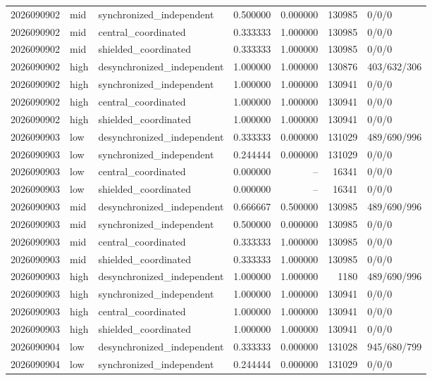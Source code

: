 \begin{longtable}{llp{38mm}rrrp{30mm}}
2026090902 & mid & synchronized\_independent & 0.500000 & 0.000000 & 130985 & 0/0/0 \\
2026090902 & mid & central\_coordinated & 0.333333 & 1.000000 & 130985 & 0/0/0 \\
2026090902 & mid & shielded\_coordinated & 0.333333 & 1.000000 & 130985 & 0/0/0 \\
2026090902 & high & desynchronized\_independent & 1.000000 & 1.000000 & 130876 & 403/632/306 \\
2026090902 & high & synchronized\_independent & 1.000000 & 1.000000 & 130941 & 0/0/0 \\
2026090902 & high & central\_coordinated & 1.000000 & 1.000000 & 130941 & 0/0/0 \\
2026090902 & high & shielded\_coordinated & 1.000000 & 1.000000 & 130941 & 0/0/0 \\
2026090903 & low & desynchronized\_independent & 0.333333 & 0.000000 & 131029 & 489/690/996 \\
2026090903 & low & synchronized\_independent & 0.244444 & 0.000000 & 131029 & 0/0/0 \\
2026090903 & low & central\_coordinated & 0.000000 & -- & 16341 & 0/0/0 \\
2026090903 & low & shielded\_coordinated & 0.000000 & -- & 16341 & 0/0/0 \\
2026090903 & mid & desynchronized\_independent & 0.666667 & 0.500000 & 130985 & 489/690/996 \\
2026090903 & mid & synchronized\_independent & 0.500000 & 0.000000 & 130985 & 0/0/0 \\
2026090903 & mid & central\_coordinated & 0.333333 & 1.000000 & 130985 & 0/0/0 \\
2026090903 & mid & shielded\_coordinated & 0.333333 & 1.000000 & 130985 & 0/0/0 \\
2026090903 & high & desynchronized\_independent & 1.000000 & 1.000000 & 1180 & 489/690/996 \\
2026090903 & high & synchronized\_independent & 1.000000 & 1.000000 & 130941 & 0/0/0 \\
2026090903 & high & central\_coordinated & 1.000000 & 1.000000 & 130941 & 0/0/0 \\
2026090903 & high & shielded\_coordinated & 1.000000 & 1.000000 & 130941 & 0/0/0 \\
2026090904 & low & desynchronized\_independent & 0.333333 & 0.000000 & 131028 & 945/680/799 \\
2026090904 & low & synchronized\_independent & 0.244444 & 0.000000 & 131029 & 0/0/0 \\

\end{longtable}
